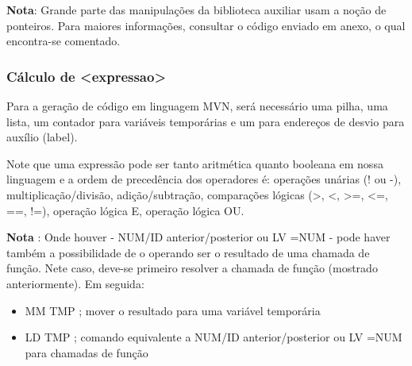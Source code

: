 \textbf{Nota}: Grande parte das manipulações da biblioteca auxiliar usam a noção de ponteiros. Para maiores informações, consultar o código enviado em anexo, o qual encontra-se comentado.

\subsubsection{Cálculo de <expressao>}

Para a geração de código em linguagem MVN, será necessário uma pilha, uma lista,  um contador para variáveis temporárias e um para endereços de desvio para auxílio (label). 


Note que uma expressão pode ser tanto aritmética quanto booleana em nossa linguagem e a ordem de precedência dos operadores é: operações unárias (! ou -), multiplicação/divisão, adição/subtração, comparações lógicas (>, <, >=, <=, ==, !=), operação lógica E, operação lógica OU. 

\textbf{Nota} : Onde houver - NUM/ID anterior/posterior ou LV =NUM - pode haver também a possibilidade de o operando ser o resultado de uma chamada de função. Nete caso, deve-se primeiro resolver a chamada de função (mostrado anteriormente). Em seguida:

\begin{itemize}
	\item MM TMP ; mover o resultado para uma variável temporária
	\item LD TMP ; comando equivalente a NUM/ID anterior/posterior ou LV =NUM para chamadas de função
\end{itemize}

